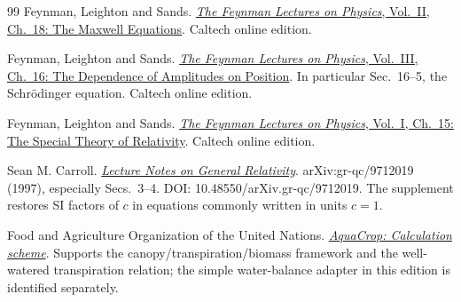 \documentclass[11pt,a4paper]{article}
\numberwithin{equation}{section}
\begin{document}
\begin{thebibliography}{99}
Feynman, Leighton and Sands. \href{https://www.feynmanlectures.caltech.edu/II_18.html}{\emph{The Feynman Lectures on Physics}, Vol.~II, Ch.~18: The Maxwell Equations}. Caltech online edition.

Feynman, Leighton and Sands. \href{https://www.feynmanlectures.caltech.edu/III_16.html}{\emph{The Feynman Lectures on Physics}, Vol.~III, Ch.~16: The Dependence of Amplitudes on Position}. In particular Sec.~16--5, the Schr\"odinger equation. Caltech online edition.

Feynman, Leighton and Sands. \href{https://www.feynmanlectures.caltech.edu/I_15.html}{\emph{The Feynman Lectures on Physics}, Vol.~I, Ch.~15: The Special Theory of Relativity}. Caltech online edition.

Sean M. Carroll. \href{https://arxiv.org/abs/gr-qc/9712019}{\emph{Lecture Notes on General Relativity}}. arXiv:gr-qc/9712019 (1997), especially Secs.~3--4. DOI: 10.48550/arXiv.gr-qc/9712019. The supplement restores SI factors of $c$ in equations commonly written in units $c=1$.

Food and Agriculture Organization of the United Nations. \href{https://www.fao.org/aquacrop/overview/calculation-scheme/en/}{\emph{AquaCrop: Calculation scheme}}. Supports the canopy/transpiration/biomass framework and the well-watered transpiration relation; the simple water-balance adapter in this edition is identified separately.
\end{thebibliography}
\endgroup
\end{document}
